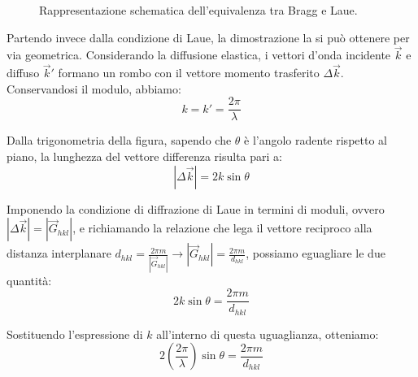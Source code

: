 \begin{figure}[htbp]
    \caption{Rappresentazione schematica dell'equivalenza tra Bragg e Laue.}
    \label{fig:bragg_laue_equivalence}
\end{figure}

Partendo invece dalla condizione di Laue, la dimostrazione la si può ottenere per via geometrica. Considerando la diffusione elastica, i vettori d'onda incidente \( \vec{k} \) e diffuso \( \vec{k}' \) formano un rombo con il vettore momento trasferito \( \Delta\vec{k} \). Conservandosi il modulo, abbiamo:
\begin{equation}
    k = k' = \frac{2\pi}{\lambda}
\end{equation}

Dalla trigonometria della figura, sapendo che \( \theta \) è l'angolo radente rispetto al piano, la lunghezza del vettore differenza risulta pari a:
\begin{equation}
    |\Delta\vec{k}| = 2k \sin\theta
\end{equation}

Imponendo la condizione di diffrazione di Laue in termini di moduli, ovvero \( |\Delta\vec{k}| = |\vec{G}_{hkl}| \), e richiamando la relazione che lega il vettore reciproco alla distanza interplanare \( d_{hkl} = \frac{2\pi m}{|\vec{G}_{hkl}|} \rightarrow |\vec{G}_{hkl}| = \frac{2\pi m}{d_{hkl}} \), possiamo eguagliare le due quantità:
\begin{equation}
    2k \sin\theta = \frac{2\pi m}{d_{hkl}}
\end{equation}

Sostituendo l'espressione di \( k \) all'interno di questa uguaglianza, otteniamo:
\begin{equation}
    2 \left( \frac{2\pi}{\lambda} \right) \sin\theta = \frac{2\pi m}{d_{hkl}}
\end{equation}

